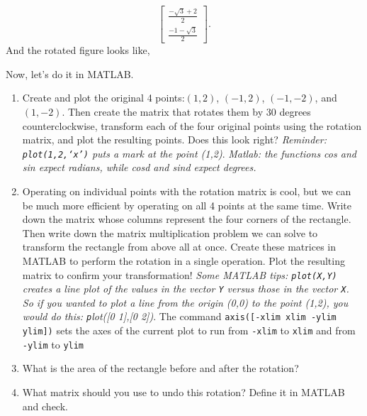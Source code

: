 \begin{sol}
\begin{enumerate}
$$\begin{bmatrix}
    \frac{-\sqrt{3}+2}{2} \\ \frac{-1 - \sqrt{3}}{2}
    \end{bmatrix}.$$
    And the rotated figure looks like,
    \begin{center}
    \end{center}
\end{enumerate}
\end{sol}

\begin{prob}
Now, let's do it in MATLAB. 
\begin{enumerate}
\item Create and plot the original 4 points:$(1,2)$, $(-1,2)$, $(-1,-2)$, and $(1,-2)$. Then create the matrix that rotates them by 30 degrees counterclockwise, transform each of the four original points using the rotation matrix, and plot the resulting points.  Does this look right? \textit{Reminder: \texttt{plot(1,2,`x')} puts a mark at the point (1,2)}. \textit{Matlab: the functions cos and sin expect radians, while cosd and sind expect degrees.}
\item  Operating on individual points with the rotation matrix is cool, but we can be much more efficient by operating on all 4 points at the same time. Write down the matrix whose columns represent the four corners of the rectangle. Then write down the matrix multiplication problem we can solve to transform the rectangle from above all at once.  Create these matrices in MATLAB to perform the rotation in a single operation.  Plot the resulting matrix to confirm your transformation!	\textit{Some MATLAB tips: \texttt{plot(X,Y)} creates a line plot of the values in the vector \texttt{Y} versus those in the vector \texttt{X}.  So if you wanted to plot a line from the origin (0,0) to the point (1,2), you would do this: \texttt plot([0 1],[0 2])}.  The command \texttt{axis([-xlim xlim -ylim ylim])} sets the axes of the current plot to run from \texttt{-xlim} to \texttt{xlim} and  from \texttt{-ylim} to \texttt{ylim}
\item What is the area of the rectangle before and after the rotation?
\item What matrix should you use to undo this rotation? Define it in MATLAB and check.

\end{enumerate}
\end{prob}
